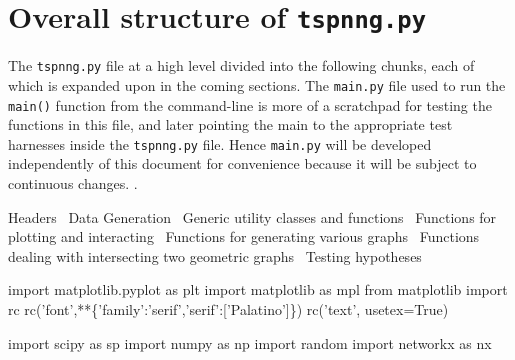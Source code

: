\nwdocspar%

\section{Overall structure of \texttt{tspnng.py}}

The \texttt{tspnng.py} file at a high level divided into the following chunks, 
each of which is expanded upon in the coming sections. The \texttt{main.py} file used to run the \texttt{main()} function
from the command-line is more of a  scratchpad for testing the functions in this file, and later pointing the 
main to the appropriate test harnesses inside the \texttt{tspnng.py} file. Hence \texttt{main.py} will be developed 
independently of this document for convenience because it will be subject to continuous changes. .  

\nwenddocs{}\endmoddef\nwstartdeflinemarkup\nwenddeflinemarkup

\LA{}Headers~{\nwtagstyle{}}\RA{}
\LA{}Data Generation~{\nwtagstyle{}}\RA{}
\LA{}Generic utility classes and functions~{\nwtagstyle{}}\RA{}
\LA{}Functions for plotting and interacting~{\nwtagstyle{}}\RA{}
\LA{}Functions for generating various graphs~{\nwtagstyle{}}\RA{}
\LA{}Functions dealing with intersecting two geometric graphs~{\nwtagstyle{}}\RA{}
\LA{}Testing hypotheses~{\nwtagstyle{}}\RA{}
\nwendcode{}\nwdocspar


\nwenddocs{}\endmoddef\nwstartdeflinemarkup{}\nwenddeflinemarkup
import matplotlib.pyplot as plt
import matplotlib as mpl
from matplotlib import rc
rc('font',**\{'family':'serif','serif':['Palatino']\})
rc('text', usetex=True)

import scipy as sp
import numpy as np
import random
import networkx as nx

